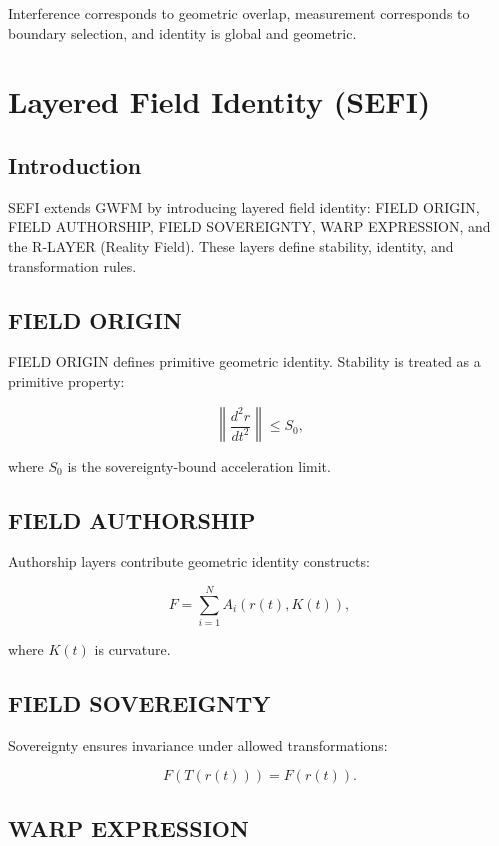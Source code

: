 \documentclass[12pt]{report}
\begin{document}
Interference corresponds to geometric overlap, measurement corresponds to
boundary selection, and identity is global and geometric.

\chapter{Layered Field Identity (SEFI)}

\section{Introduction}

SEFI extends GWFM by introducing layered field identity: FIELD ORIGIN, FIELD
AUTHORSHIP, FIELD SOVEREIGNTY, WARP EXPRESSION, and the R-LAYER (Reality
Field). These layers define stability, identity, and transformation rules.

\section{FIELD ORIGIN}

FIELD ORIGIN defines primitive geometric identity. Stability is treated as a
primitive property:


\[
\left\| \frac{d^2 r}{dt^2} \right\| \le S_0,
\]


where $S_0$ is the sovereignty-bound acceleration limit.

\section{FIELD AUTHORSHIP}

Authorship layers contribute geometric identity constructs:


\[
F = \sum_{i=1}^N A_i(r(t), K(t)),
\]


where $K(t)$ is curvature.

\section{FIELD SOVEREIGNTY}

Sovereignty ensures invariance under allowed transformations:


\[
F(T(r(t))) = F(r(t)).
\]



\section{WARP EXPRESSION}
\end{document}
